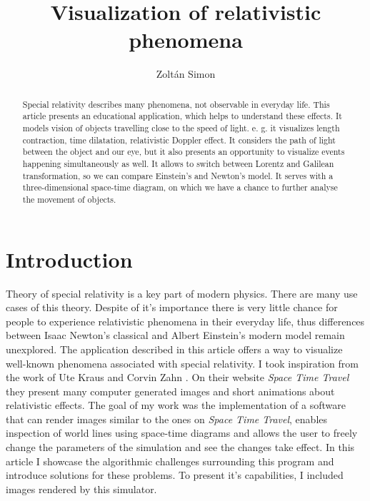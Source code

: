 \documentclass{egpubl}
\title[Visualization of relativity]{Visualization of relativistic phenomena}
\author{Zoltán Simon}
\begin{document}
\maketitle

\begin{abstract}
Special relativity describes many phenomena, not observable in everyday life. This article presents an educational application, which helps to understand these effects. It models vision of objects travelling close to the speed of light. e. g. it visualizes length contraction, time dilatation, relativistic Doppler effect. It considers the path of light between the object and our eye, but it also presents an opportunity to visualize events happening simultaneously as well. It allows to switch between Lorentz and Galilean transformation, so we can compare Einstein's and Newton's model. It serves with a three-dimensional space-time diagram, on which we have a chance to further analyse the movement of objects.
\end{abstract}

\section{Introduction}
\label{sec:introduction}
Theory of special relativity \cite{EinsteinElectrodynamics} is a key part of modern physics. There are many use cases of this theory. Despite of it's importance there is very little chance for people to experience relativistic phenomena in their everyday life, thus differences between Isaac Newton's classical and Albert Einstein's modern model remain unexplored. The application described in this article offers a way to visualize well-known phenomena associated with special relativity. I took inspiration from the work of Ute Kraus and Corvin Zahn \cite{krausZahn}. On their website \emph{Space Time Travel} they present many computer generated images and short animations about relativistic effects. The goal of my work was the implementation of a software that can render images similar to the ones on \emph{Space Time Travel}, enables inspection of world lines using space-time diagrams and allows the user to freely change the parameters of the simulation and see the changes take effect. In this article I showcase the algorithmic challenges surrounding this program and introduce solutions for these problems. To present it's capabilities, I included images rendered by this simulator.
\end{document}
